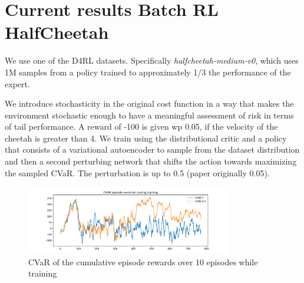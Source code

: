 \pagebreak


\section{Current results Batch RL HalfCheetah}
We use one of the D4RL datasets.
Specifically \textit{halfcheetah-medium-v0}, which uses 1M samples from a policy trained
to approximately 1/3 the performance of the expert.

We introduce stochasticity in the original cost function in a way that 
makes the environment stochastic enough to have a meaningful assessment of risk in terms of 
tail performance.
A reward of -100 is given wp 0.05, if the velocity of the cheetah is greater than 4.
We train using the distributional critic and a policy that consists of a variational autoencoder
to sample from the dataset distribution and then a second perturbing network that shifts the
action towards maximizing the sampled CVaR.
The perturbation is up to 0.5 (paper originally 0.05).

\begin{figure}[ht]
        \centering
        \includegraphics[width=0.8\textwidth]{images/Cheetah_offpolicy_medium/cvar_train.pdf}
        \caption{CVaR of the cumulative episode rewards over 10 episodes while training}
        \label{cvar_cheetah}
    
\end{figure}
